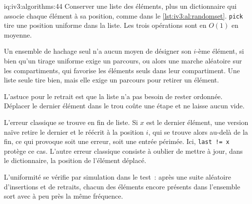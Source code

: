 \begin{solution}{iq:iv3:algorithms:44}
Conserver une liste des éléments, plus un dictionnaire qui associe chaque élément à sa position, comme dans le \cref{lst:iv3:al:randomset}. \texttt{pick} tire une position uniforme dans la liste. Les trois opérations sont en $O(1)$ en moyenne.
\label{lst:iv3:al:randomset}

Un ensemble de hachage seul n'a aucun moyen de désigner son $i$-ème élément, si bien qu'un tirage uniforme exige un parcours, ou alors une marche aléatoire sur les compartiments, qui favorise les éléments seuls dans leur compartiment. Une liste seule tire bien, mais elle exige un parcours pour retirer un élément.

L'astuce pour le retrait est que la liste n'a pas besoin de rester ordonnée. Déplacer le dernier élément dans le trou coûte une étape et ne laisse aucun vide.

L'erreur classique se trouve en fin de liste. Si $x$ est le dernier élément, une version naïve retire le dernier et le réécrit à la position $i$, qui se trouve alors au-delà de la fin, ce qui provoque soit une erreur, soit une entrée périmée. Ici, \texttt{last != x} protège ce cas. L'autre erreur classique consiste à oublier de mettre à jour, dans le dictionnaire, la position de l'élément déplacé.

L'uniformité se vérifie par simulation dans le test~: après une suite aléatoire d'insertions et de retraits, chacun des éléments encore présents dans l'ensemble sort avec à peu près la même fréquence.

\end{solution}

